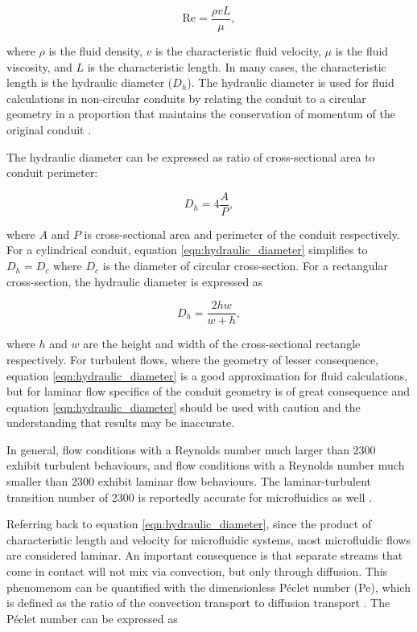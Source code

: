 \begin{equation}
    \text{Re} = \frac{\rho v L}{\mu},
\end{equation}

\noindent where $\rho$ is the fluid density, $v$ is the characteristic fluid velocity, $\mu$ is the fluid viscosity, and $L$ is the characteristic length. In many cases, the characteristic length is the hydraulic diameter ($D_h$). The hydraulic diameter is used for fluid calculations in non-circular conduits by relating the conduit to a circular geometry in a proportion that maintains the conservation of momentum of the original conduit \cite{PAMB}.

\par The hydraulic diameter can be expressed as ratio of cross-sectional area to conduit perimeter:

\begin{equation}
    D_h = 4 \frac{A}{P},
    \label{eqn:hydraulic_diameter}
\end{equation}

\noindent where $A$ and $P$ is cross-sectional area and perimeter of the conduit respectively. For a cylindrical conduit, equation \ref{eqn:hydraulic_diameter} simplifies to $D_h = D_c$ where $D_c$ is the diameter of circular cross-section. For a rectangular cross-section, the hydraulic diameter is expressed as 

\begin{equation}
    D_h = \frac{2hw}{w+h},
\end{equation}

\noindent where $h$ and $w$ are the height and width of the cross-sectional rectangle respectively. For turbulent flows, where the geometry of lesser consequence, equation \ref{eqn:hydraulic_diameter} is a good approximation for fluid calculations, but for laminar flow specifics of the conduit geometry is of great consequence and equation \ref{eqn:hydraulic_diameter} should be used with caution and the understanding that results may be inaccurate. 

\par In general, flow conditions with a Reynolds number much larger than 2300 exhibit turbulent behaviours, and flow conditions with a Reynolds number much smaller than 2300 exhibit laminar flow behaviours. The laminar-turbulent transition number of 2300 is reportedly accurate for microfluidics as well \cite{PAMB-14}.

\par Referring back to equation \ref{eqn:hydraulic_diameter}, since the product of characteristic length and velocity for microfluidic systems, most microfluidic flows are considered laminar. An important consequence is that separate streams that come in contact will not mix via convection, but only through diffusion. This phenomenom can be quantified with the dimensionless P\'eclet number (Pe), which is defined as the ratio of the convection transport to diffusion transport \cite{micromixers}. The P\'eclet number can be expressed as 

